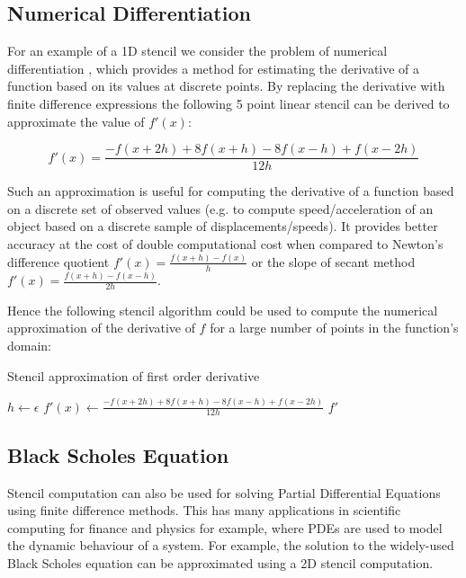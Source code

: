 \subsection{Numerical Differentiation}

For an example of a 1D stencil we consider the problem of numerical
differentiation \cite{lyness1967numerical}, which provides a method for
estimating the derivative of a function based on its values at
discrete points. By replacing the derivative with finite difference
expressions the following 5 point linear stencil can be derived to
approximate the value of $f'(x)$:

\begin{equation}
  f'(x) = \frac{-f(x + 2h) + 8f(x+h) - 8f(x-h) + f(x - 2h)}{12h}
\end{equation}

Such an approximation is useful for computing the derivative of a
function based on a discrete set of observed values (e.g. to compute
speed/acceleration of an object based on a discrete sample of
displacements/speeds). It provides better accuracy at the cost of
double computational cost when compared to Newton's difference
quotient $f'(x) = \frac{f(x + h) - f(x)}{h}$ or the slope of secant
method $f'(x)=\frac{f(x+h) - f(x - h)}{2h}$.

Hence the following stencil algorithm could be used to compute the
numerical approximation of the derivative of $f$ for a large number of
points in the function's domain:

\begin{algorithm}
  \caption{Stencil approximation of first order derivative}
  \begin{algorithmic}
    \State $h \gets \epsilon$
    \State $f'(x) \gets  \frac{-f(x + 2h) + 8f(x+h) - 8f(x-h) + f(x - 2h)}{12h}$
    \EndFor
    \State \Return $f'$
    \EndFunction
  \end{algorithmic}
\end{algorithm}

\subsection{Black Scholes Equation}

Stencil computation can also be used for solving Partial Differential
Equations using finite difference methods. This has many applications
in scientific computing for finance and physics for example, where
PDEs are used to model the dynamic behaviour of a system. For example,
the solution to the widely-used Black Scholes equation can be
approximated using a 2D stencil computation.

